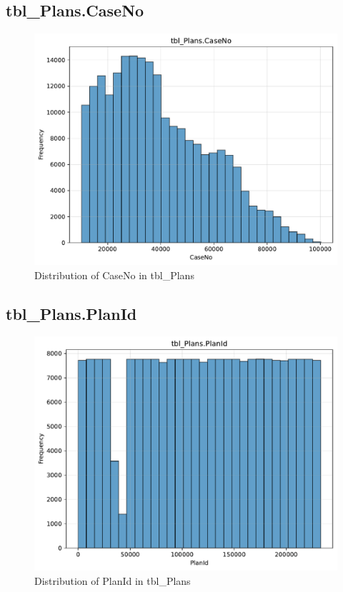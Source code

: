 \subsection{tbl\_Plans.CaseNo}

\begin{figure}[htbp]
\centering
\includegraphics[width=\textwidth]{figures/dbo_tbl_Plans_CaseNo.pdf}
\caption{Distribution of CaseNo in tbl\_Plans}
\end{figure}\newpage

\subsection{tbl\_Plans.PlanId}

\begin{figure}[htbp]
\centering
\includegraphics[width=\textwidth]{figures/dbo_tbl_Plans_PlanId.pdf}
\caption{Distribution of PlanId in tbl\_Plans}
\end{figure}\newpage

